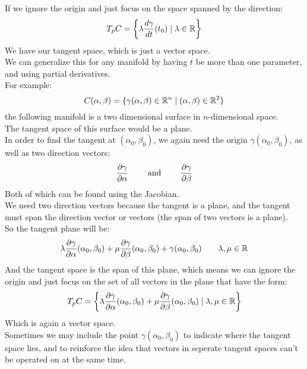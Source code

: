 \documentclass[12pt]{article}
\begin{document}
If we ignore the origin and just focus
on the space spanned by the direction:
\[ T_pC = \left\{  \lambda \dfrac{d\gamma}{dt}(t_0)
\mid \lambda \in \mathbb{R}  \right\} \]
We have our tangent space,
which is just a vector space. \\

We can generalize this for any manifold
by having $t$ be more than one parameter,
and using partial derivatives. \\

For example:
\[ C(\alpha, \beta) =
\{\gamma(\alpha, \beta) \in \mathbb{R}^n 
\mid (\alpha, \beta) \in \mathbb{R}^2 \} \]
the following manifold is a two dimensional
surface in $n$-dimensional space. \\
The tangent space of this surface would be a
plane. \\
In order to find the tangent at 
$(\alpha_0, \beta_0)$, we again need the origin
$\gamma(\alpha_0, \beta_0)$,
as well as two direction vectors:
\[ \dfrac{\partial \gamma}{\partial \alpha}
\qquad \text{ and } \qquad \dfrac{\partial \gamma}{\partial \beta} \]
Both of which can be found using the Jacobian. \\
We need two direction vectors because the
tangent is a plane, and the tangent
must span the direction vector or vectors
(the span of two vectors is a plane). \\
So the tangent plane will be:
\[
\lambda \dfrac{\partial \gamma}{\partial \alpha}(\alpha_0, \beta_0) +
\mu \dfrac{\partial \gamma}{\partial \beta}(\alpha_0, \beta_0) +
\gamma(\alpha_0, \beta_0) \qquad
\lambda, \mu \in \mathbb{R} \]
And the tangent space is the
span of this plane, which means we
can ignore the origin and just focus
on the set of all vectors in the plane
that have the form:
\[ T_pC = \left\{  
\lambda \dfrac{\partial \gamma}{\partial \alpha}(\alpha_0, \beta_0)
+ \mu \dfrac{\partial \gamma}{\partial \beta}(\alpha_0, \beta_0) 
\mid \lambda, \mu \in \mathbb{R}  \right\} \]
Which is again a vector space. \\

Sometimes we may include the point
$\gamma(\alpha_0, \beta_0)$ to indicate 
where the tangent space lies, and to reinforce
the idea that vectors in seperate tangent spaces
can't be operated on at the same time. \\
\end{document}

